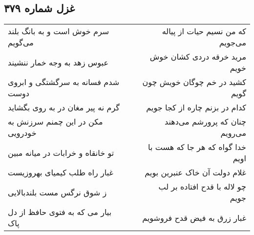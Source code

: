 \begin{center}
\section*{غزل شماره ۳۷۹}
\label{sec:sh379}
\begin{longtable}{l p{0.5cm} r}
سرم خوش است و به بانگ بلند می‌گویم
&&
که من نسیم حیات از پیاله می‌جویم
\\
عبوس زهد به وجه خمار ننشیند
&&
مرید خرقه دردی کشان خوش خویم
\\
شدم فسانه به سرگشتگی و ابروی دوست
&&
کشید در خم چوگان خویش چون گویم
\\
گرم نه پیر مغان در به روی بگشاید
&&
کدام در بزنم چاره از کجا جویم
\\
مکن در این چمنم سرزنش به خودرویی
&&
چنان که پرورشم می‌دهند می‌رویم
\\
تو خانقاه و خرابات در میانه مبین
&&
خدا گواه که هر جا که هست با اویم
\\
غبار راه طلب کیمیای بهروزیست
&&
غلام دولت آن خاک عنبرین بویم
\\
ز شوق نرگس مست بلندبالایی
&&
چو لاله با قدح افتاده بر لب جویم
\\
بیار می که به فتوی حافظ از دل پاک
&&
غبار زرق به فیض قدح فروشویم
\\
\end{longtable}
\end{center}
